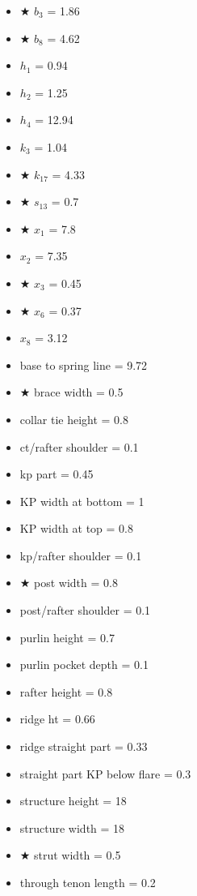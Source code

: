 \documentclass{article}\usepackage[]{graphicx}\usepackage[]{xcolor}
\begin{document}
\begin{multicols}{2}
\begin{itemize}
  \item $\bigstar$ $b_3$ = 1.86
  \item $\bigstar$ $b_8$ = 4.62
  \item $h_1$ = 0.94
  \item $h_2$ = 1.25
  \item $h_4$ = 12.94
  \item $k_3$ = 1.04
  \item $\bigstar$ $k_{17}$ = 4.33
  \item $\bigstar$ $s_{13}$ = 0.7
  \item $\bigstar$ $x_1$ = 7.8
  \item $x_2$ = 7.35
  \item $\bigstar$ $x_3$ = 0.45
  \item $\bigstar$ $x_6$ = 0.37
  \item $x_8$ = 3.12
  \item base to spring line = 9.72
  \item $\bigstar$ brace width = 0.5
  \item collar tie height = 0.8
  \item ct/rafter shoulder = 0.1
  \item kp part = 0.45
  \item KP width at bottom = 1
  \item KP width at top = 0.8
  \item kp/rafter shoulder = 0.1
  \item $\bigstar$ post width = 0.8
  \item post/rafter shoulder = 0.1
  \item purlin height = 0.7
  \item purlin pocket depth = 0.1
  \item rafter height = 0.8
  \item ridge ht = 0.66
  \item ridge straight part = 0.33
  \item straight part KP below flare = 0.3
  \item structure height = 18
  \item structure width = 18
  \item $\bigstar$ strut width = 0.5
  \item through tenon length = 0.2
\end{itemize}
\end{multicols}

\newpage
\end{document}

